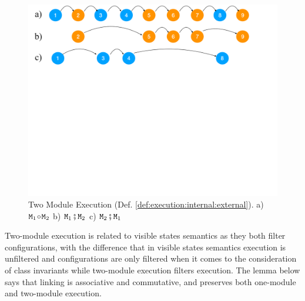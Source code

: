 \begin{figure}[htb]
  \vspace*{-2.5mm}
  \begin{center}
   \begin{minipage}{0.80\textwidth}
     \begin{center}
       \includegraphics[width=\linewidth]{diagrams/VisibleStates.pdf}
     \end{center}
   \end{minipage}
   \end{center}
   \vspace*{-2.5mm}
   \caption{Two Module Execution
     (Def. \ref{def:execution:internal:external}). %
     a) ${\mbox{\tt{\ensuremath{{\mbox{\tt{M}}}}}}}_1 \!\circ\! {\mbox{\tt{\ensuremath{{\mbox{\tt{M}}}}}}}_2$ b) ${\mbox{\tt{\ensuremath{{\mbox{\tt{M}}}}}}}_1 \fatsemi {\mbox{\tt{\ensuremath{{\mbox{\tt{M}}}}}}}_2$ c) ${\mbox{\tt{\ensuremath{{\mbox{\tt{M}}}}}}}_2 \fatsemi {\mbox{\tt{\ensuremath{{\mbox{\tt{M}}}}}}}_1$}
   \label{fig:VisibleStates}
 \end{figure}

Two-module execution  is related to %
visible states
semantics \cite{MuellerPoetzsch-HeffterLeavens06} as they both filter configurations, with  the difference
that in visible states semantics %
execution is unfiltered and  configurations are only filtered when it comes to the  consideration 
of class invariants\jm{,} while two-module execution filters execution.
%
The lemma below says  that linking is associative and commutative, and preserves   both one-module and two-module execution.

